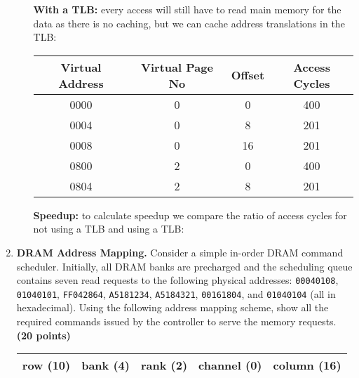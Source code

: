 \documentclass[a4paper, 11pt]{exam}
\begin{document}
\begin{enumerate}
\begin{enumerate}

	\textbf{With a TLB:} every access will still have to read main memory for the data as there is no caching, but we can cache address translations in the TLB:
	
	\begin{center}
	\begin{tabular}{ |c|c|c|c| } 
		\hline
		\textbf{Virtual Address}& \textbf{Virtual Page No} & \textbf{Offset} & \textbf{Access Cycles} \\ 
		\hline
		0000 & 0 & 0 & 400\\ \hline
		0004 & 0 & 8 & 201 \\ \hline
		0008 & 0 & 16 & 201 \\ \hline
		0800 & 2 & 0 & 400\\ \hline
		0804 & 2& 8 & 201 \\ \hline
	\end{tabular}
	\end{center}
	
	
	\textbf{Speedup:} to calculate speedup we compare the ratio of access cycles for not using a TLB and using a TLB:
	
\end{enumerate}






\item \textbf {DRAM Address Mapping.}
Consider a simple in-order DRAM command scheduler.
Initially, all DRAM banks are precharged and the scheduling queue contains seven read requests to the following physical addresses: 
\texttt{00040108},
\texttt{01040101},
\texttt{FF042864},
\texttt{A5181234},
\texttt{A5184321},
\texttt{00161804}, and
\texttt{01040104}
(all in hexadecimal).
Using the following address mapping scheme, show all the required commands issued by the controller to serve the memory requests.
\textbf{(20 points)}

\begin{center}
	\begin{tabular}{|c|c|c|c|c|}
		\hline
		row (10)&bank (4)&rank (2)&channel (0)&column (16) \\
		\hline
	\end{tabular}
\end{center}


\end{enumerate}
\end{document}
